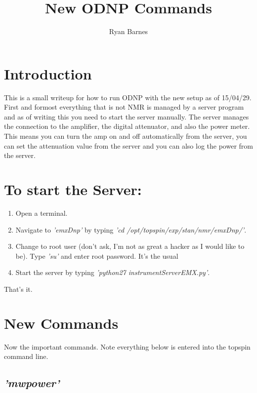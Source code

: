 \documentclass{article}
\title{New ODNP Commands}
\author{Ryan Barnes}
\newcommand{\fc}[1]{{\color{blue}\textit{'{#1}'}}}
\begin{document}
\maketitle





\section{Introduction}

This is a small writeup for how to run ODNP with the new setup as of 15/04/29.\\


First and formost everything that is not NMR is managed by a server program and as of writing this you need to start the server manually. The server manages the connection to the amplifier, the digital attenuator, and also the power meter. This means you can turn the amp on and off automatically from the server, you can set the attenuation value from the server and you can also log the power from the server.\\

\section{To start the Server:}
\begin{enumerate}
    \item Open a terminal.
    \item Navigate to \fc{emxDnp} by typing \fc{cd /opt/topspin/exp/stan/nmr/emxDnp/}.
    \item Change to root user (don't ask, I'm not as great a hacker as I would like to be). Type \fc{su} and enter root password. It's the usual
    \item Start the server by typing \fc{python27 instrumentServerEMX.py}.
\end{enumerate}

That's it.

\section{New Commands}
Now the important commands. Note everything below is entered into the topspin command line.

\subsection{\fc{mwpower}} 
\end{document}
